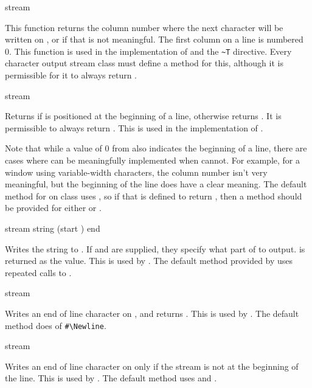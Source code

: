  {stream}

This function returns the column number where the next character will be written
on , or  if that is not meaningful.  The first column on a
line is numbered 0.  This function is used in the implementation of 
and the  \verb+~T+ directive.  Every character output stream class
must define a method for this, although it is permissible for it to always
return .

 {stream}

Returns  if  is positioned at the beginning of a line,
otherwise returns .  It is permissible to always return
.  This is used in the implementation of .

Note that while a value of 0 from  also indicates the
beginning of a line, there are cases where  can be
meaningfully implemented when  cannot.  For example, for
a window using variable-width characters, the column number isn't very
meaningful, but the beginning of the line does have a clear meaning.  The
default method for  on class
 uses , so if
that is defined to return , then a method should be provided for either
 or .

 {stream string \optional (start ) end}

Writes the string  to .  If  and 
are supplied, they specify what part of  to output.   is
returned as the value.  This is used by .  The default method
provided by  uses repeated calls to
.

 {stream}

Writes an end of line character on , and returns .  This
is used by .  The default method does  of
\verb+#\Newline+.

 {stream}

Writes an end of line character on  only if the stream is not at the
beginning of the line.  This is used by .  The default method
uses  and .

